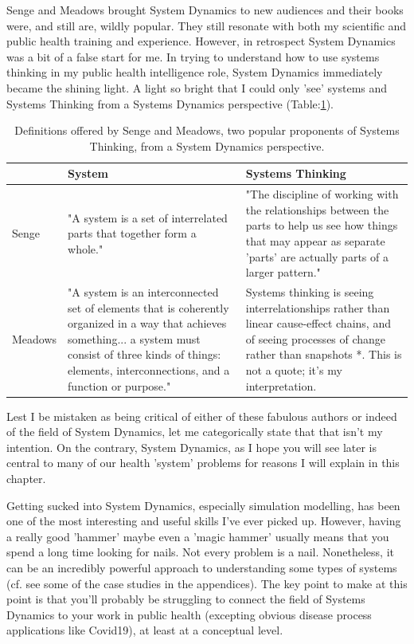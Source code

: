 Senge and Meadows brought System Dynamics to new audiences and their books were, and still are, wildly popular. They still resonate with both my scientific and public health training and experience. However, in retrospect System Dynamics was a bit of a false start for me. In trying to understand how to use systems thinking in my public health intelligence role, System Dynamics immediately became the shining light. A light so bright that I could only 'see' systems and Systems Thinking from a Systems Dynamics perspective (Table:\ref{tab:sysdyndfn}).

\begin{table}[h]
	\begin{center}
		\footnotesize%
		\begin{tabular}{p{1.75cm} p{3.75cm} p{3.75cm}}
			\toprule
			 & System & Systems Thinking \\
			\midrule
			Senge    & "A system is a set of interrelated parts that together form a whole." & "The discipline of working with the relationships between the parts to help us see how things that may appear as separate 'parts' are actually parts of a larger pattern." \\
			\midrule
			Meadows & "A system is an interconnected set of elements that is coherently organized in a way that achieves something... a system must consist of three kinds of things: elements, interconnections, and a function or purpose." & Systems thinking is seeing interrelationships rather than linear cause-effect chains, and of seeing processes of change rather than snapshots *. \linebreak \linebreak * This is not a quote; it's my interpretation. \\
			\bottomrule
		\end{tabular}
	\end{center}
	\caption{Definitions offered by Senge and Meadows, two popular proponents of Systems Thinking, from a System Dynamics perspective.}
	\label{tab:sysdyndfn}
\end{table}

Lest I be mistaken as being critical of either of these fabulous authors or indeed of the field of System Dynamics, let me categorically state that that isn't my intention. On the contrary, System Dynamics, as I hope you will see later is central to many of our health 'system' problems for reasons I will explain in this chapter.

Getting sucked into System Dynamics, especially simulation modelling, has been one of the most interesting and useful skills I've ever picked up. However, having a really good 'hammer' maybe even a 'magic hammer' usually means that you spend a long time looking for nails. Not every problem is a nail. Nonetheless, it can be an incredibly powerful approach to understanding some types of systems (cf. see some of the case studies in the appendices). The key point to make at this point is that you'll probably be struggling to connect the field of Systems Dynamics to your work in public health (excepting obvious disease process applications like Covid19), at least at a conceptual level.

